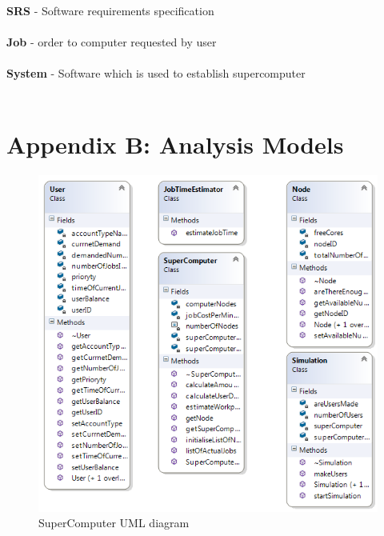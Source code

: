 \documentclass{scrreprt}
\begin{document}
\textbf{SRS }- Software requirements specification
\\
\\
\textbf{Job} - order to computer requested by user
\\
\\
\textbf{System} - Software which is used to establish supercomputer
\\
\\

\section{Appendix B: Analysis Models}

\begin{figure}[h!]
\centering
\includegraphics{ClassDiagram.png}
\caption{SuperComputer UML diagram}

\end{figure}
\FloatBarrier
\end{document}
